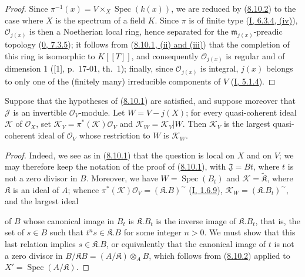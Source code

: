 \begin{proof}
Since $\pi^{-1}(x)=V\times_X\operatorname{Spec}(k(x))$, we are reduced by
(\hyperref[II.8.10.2]{8.10.2}) to the case where $X$ is the spectrum of a
field $K$. Since $\pi$ is of finite type
(\hyperref[I.6.3.4]{I, 6.3.4, (iv)}), $\mathcal{O}_{j(x)}$ is then a
Noetherian local ring, hence separated for the
$\mathfrak{m}_{j(x)}$-preadic topology
(\hyperref[0.7.3.5]{0, 7.3.5}); it follows from
(\hyperref[II.8.10.1]{8.10.1, (ii) and (iii)}) that the completion of this
ring is isomorphic to $K[[T]]$, and consequently $\mathcal{O}_{j(x)}$ is
regular and of dimension 1 ([1], p.~17-01, th.~1); finally, since
$\mathcal{O}_{j(x)}$ is integral, $j(x)$ belongs to only one of the
(finitely many) irreducible components of $V$
(\hyperref[I.5.1.4]{I, 5.1.4}).
\end{proof}

\begin{corollary}[8.10.4]
\label{II.8.10.4}
Suppose that the hypotheses of (\hyperref[II.8.10.1]{8.10.1}) are
satisfied, and suppose moreover that $\mathcal{J}$ is an invertible
$\mathcal{O}_V$-module. Let $W=V-j(X)$; for every quasi-coherent ideal
$\mathcal{K}$ of $\mathcal{O}_X$, set
$\mathcal{K}_V=\pi^*(\mathcal{K})\mathcal{O}_V$ and
$\mathcal{K}_W=\mathcal{K}_V|W$. Then $\mathcal{K}_V$ is the largest
quasi-coherent ideal of $\mathcal{O}_V$ whose restriction to $W$ is
$\mathcal{K}_W$.
\end{corollary}

\begin{proof}
Indeed, we see as in (\hyperref[II.8.10.1]{8.10.1}) that the question
is local on $X$ and on $V$; we may therefore keep the notation of the
proof of (\hyperref[II.8.10.1]{8.10.1}), with
$\mathfrak{J}=Bt$, where $t$ is not a zero divisor in $B$. Moreover, we have
$W=\operatorname{Spec}(B_t)$ and $\mathcal{K}=\widetilde{\mathfrak{K}}$, where
$\mathfrak{K}$ is an ideal of $A$; whence
$\pi^*(\mathcal{K})\mathcal{O}_V=(\mathfrak{K}.B)^{\sim}$
(\hyperref[I.1.6.9]{I, 1.6.9}),
$\mathcal{K}_W=(\mathfrak{K}.B_t)^{\sim}$, and the largest ideal

of $B$ whose canonical image in $B_t$ is $\mathfrak{K}.B_t$ is the inverse
image of $\mathfrak{K}.B_t$, that is, the set of $s\in B$ such
that $t^ns\in\mathfrak{K}.B$ for some integer $n>0$. We must show that
this last relation implies $s\in\mathfrak{K}.B$, or equivalently that the
canonical image of $t$ is not a zero divisor in
$B/\mathfrak{K}B=(A/\mathfrak{K})\otimes_A B$, which follows from
(\hyperref[II.8.10.2]{8.10.2}) applied to
$X'=\operatorname{Spec}(A/\mathfrak{K})$.
\end{proof}

